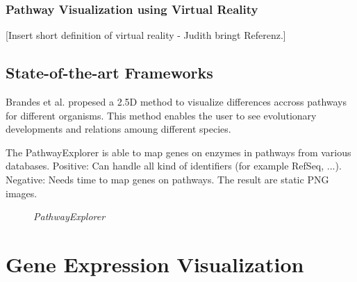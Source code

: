 \subsubsection{Pathway Visualization using Virtual Reality}

[Insert short definition of virtual reality - Judith bringt Referenz.]

\subsection{State-of-the-art Frameworks}

Brandes et al. propesed a 2.5D method to visualize differences accross pathways for different organisms\citep{Brandes2004}. This method enables the user to see evolutionary developments and relations amoung different species.


The PathwayExplorer is able to map genes on enzymes in pathways from various databases.
Positive: Can handle all kind of identifiers (for example RefSeq, ...).
Negative: Needs time to map genes on pathways. The result are static PNG images.

\begin{figure}[ht]
\centering
{} 
\caption[PathwayExplorer]{\textit{PathwayExplorer}} 
\label{gfx:pathway_explorer}
\end{figure}

\section{Gene Expression Visualization}

